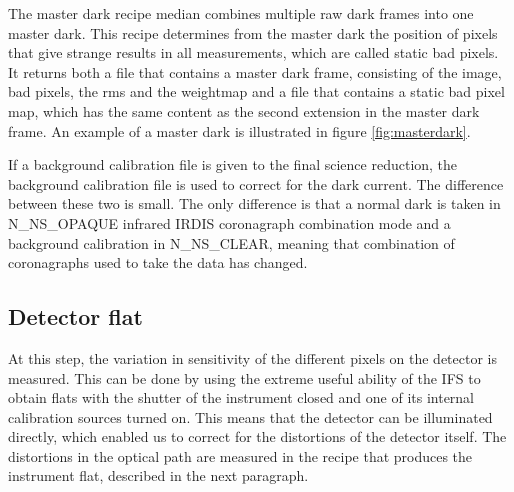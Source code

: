 \documentclass[twoside,single]{lion-msc}
\begin{document}
The master dark recipe median combines multiple raw dark frames into one master dark. This recipe determines from the master dark the position of pixels that give strange results in all measurements, which are called static bad pixels. It returns both a file that contains a master dark frame, consisting of the image, bad pixels, the rms and the weightmap and a file that contains a static bad pixel map, which has the same content as the second extension in the master dark frame. An example of a master dark is illustrated in figure \ref{fig:masterdark}. 
\bigskip

If a background calibration file is given to the final science reduction, the background calibration file is used to correct for the dark current. The difference between these two is small. The only difference is that a normal dark is taken in N\_NS\_OPAQUE infrared IRDIS coronagraph combination mode and a background calibration in N\_NS\_CLEAR, meaning that combination of coronagraphs used to take the data has changed\cite{Mouillet2013}.

\subsection{Detector flat}
At this step, the variation in sensitivity of the different pixels on the detector is measured. This can be done by using the extreme useful ability of the IFS to obtain flats with the shutter of the instrument closed and one of its internal calibration sources turned on. This means that the detector can be illuminated directly, which enabled us to correct for the distortions of the detector itself. The distortions in the optical path are measured in the recipe that produces the instrument flat, described in the next paragraph. 
\bigskip
\end{document}

